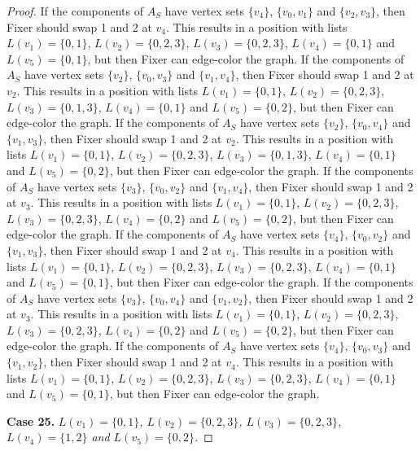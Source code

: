 \documentclass[12pt]{amsart}
\theoremstyle{plain}
\theoremstyle{definition}
\theoremstyle{remark}
\begin{document}
\begin{proof}
If the components of $A_S$ have vertex sets $\{v_4\}$, $\{v_0, v_1\}$ and $\{v_2, v_3\}$, then Fixer should swap 1 and 2 at $v_4$. This results in a position with lists $L(v_1) = \{0, 1\}$, $L(v_2) = \{0, 2, 3\}$, $L(v_3) = \{0, 2, 3\}$, $L(v_4) = \{0, 1\}$ and $L(v_5) = \{0, 1\}$, but then Fixer can edge-color the graph.
If the components of $A_S$ have vertex sets $\{v_2\}$, $\{v_0, v_3\}$ and $\{v_1, v_4\}$, then Fixer should swap 1 and 2 at $v_2$. This results in a position with lists $L(v_1) = \{0, 1\}$, $L(v_2) = \{0, 2, 3\}$, $L(v_3) = \{0, 1, 3\}$, $L(v_4) = \{0, 1\}$ and $L(v_5) = \{0, 2\}$, but then Fixer can edge-color the graph.
If the components of $A_S$ have vertex sets $\{v_2\}$, $\{v_0, v_4\}$ and $\{v_1, v_3\}$, then Fixer should swap 1 and 2 at $v_2$. This results in a position with lists $L(v_1) = \{0, 1\}$, $L(v_2) = \{0, 2, 3\}$, $L(v_3) = \{0, 1, 3\}$, $L(v_4) = \{0, 1\}$ and $L(v_5) = \{0, 2\}$, but then Fixer can edge-color the graph.
If the components of $A_S$ have vertex sets $\{v_3\}$, $\{v_0, v_2\}$ and $\{v_1, v_4\}$, then Fixer should swap 1 and 2 at $v_3$. This results in a position with lists $L(v_1) = \{0, 1\}$, $L(v_2) = \{0, 2, 3\}$, $L(v_3) = \{0, 2, 3\}$, $L(v_4) = \{0, 2\}$ and $L(v_5) = \{0, 2\}$, but then Fixer can edge-color the graph.
If the components of $A_S$ have vertex sets $\{v_4\}$, $\{v_0, v_2\}$ and $\{v_1, v_3\}$, then Fixer should swap 1 and 2 at $v_4$. This results in a position with lists $L(v_1) = \{0, 1\}$, $L(v_2) = \{0, 2, 3\}$, $L(v_3) = \{0, 2, 3\}$, $L(v_4) = \{0, 1\}$ and $L(v_5) = \{0, 1\}$, but then Fixer can edge-color the graph.
If the components of $A_S$ have vertex sets $\{v_3\}$, $\{v_0, v_4\}$ and $\{v_1, v_2\}$, then Fixer should swap 1 and 2 at $v_3$. This results in a position with lists $L(v_1) = \{0, 1\}$, $L(v_2) = \{0, 2, 3\}$, $L(v_3) = \{0, 2, 3\}$, $L(v_4) = \{0, 2\}$ and $L(v_5) = \{0, 2\}$, but then Fixer can edge-color the graph.
If the components of $A_S$ have vertex sets $\{v_4\}$, $\{v_0, v_3\}$ and $\{v_1, v_2\}$, then Fixer should swap 1 and 2 at $v_4$. This results in a position with lists $L(v_1) = \{0, 1\}$, $L(v_2) = \{0, 2, 3\}$, $L(v_3) = \{0, 2, 3\}$, $L(v_4) = \{0, 1\}$ and $L(v_5) = \{0, 1\}$, but then Fixer can edge-color the graph.

\noindent\textbf{Case 25.  }\textit{$L(v_1) = \{0, 1\}$, $L(v_2) = \{0, 2, 3\}$, $L(v_3) = \{0, 2, 3\}$, $L(v_4) = \{1, 2\}$ and $L(v_5) = \{0, 2\}$.}


\end{proof}
\end{document}
